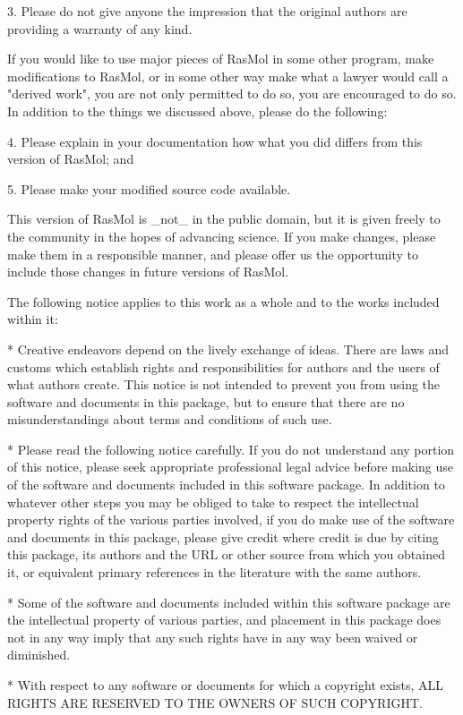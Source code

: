   3.  Please do not give anyone the impression that the original
authors are providing a warranty of any kind.

If you would like to use major pieces of RasMol in some other program,
make modifications to RasMol, or in some other way make what a lawyer
would call a "derived work", you are not only permitted to do so, you
are encouraged to do so. In addition to the things we discussed above,
please do the following:

  4.  Please explain in your documentation how what you did differs
from this version of RasMol; and

  5.  Please make your modified source code available.

This version of RasMol is _not_ in the public domain, but it is given
freely to the community in the hopes of advancing science.  If you make
changes, please make them in a responsible manner, and please offer us
the opportunity to include those changes in future versions of RasMol.

The following notice applies to this work as a whole and to the works
included within it:

* Creative endeavors depend on the lively exchange of ideas. There are laws
and customs which establish rights and responsibilities for authors and the
users of what authors create. This notice is not intended to prevent you
from using the software and documents in this package, but to ensure that
there are no misunderstandings about terms and conditions of such use.

* Please read the following notice carefully. If you do not understand any
portion of this notice, please seek appropriate professional legal advice
before making use of the software and documents included in this software
package. In addition to whatever other steps you may be obliged to take
to respect the intellectual property rights of the various parties
involved, if you do make use of the software and documents in this package,
please give credit where credit is due by citing this package, its authors
and the URL or other source from which you obtained it, or equivalent
primary references in the literature with the same authors.

* Some of the software and documents included within this software package
are the intellectual property of various parties, and placement in this
package does not in any way imply that any such rights have in any way been
waived or diminished.

* With respect to any software or documents for which a copyright exists,
ALL RIGHTS ARE RESERVED TO THE OWNERS OF SUCH COPYRIGHT.

